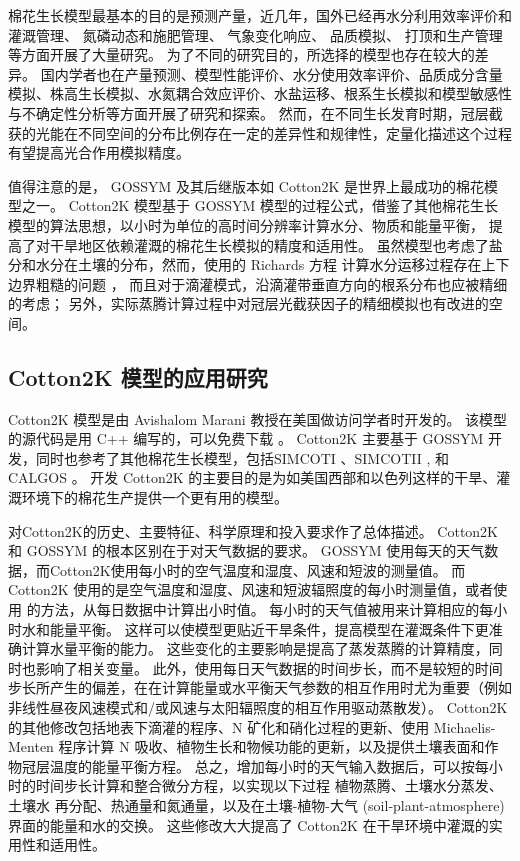 棉花生长模型最基本的目的是预测产量，近几年，国外已经再水分利用效率评价和灌溉管理\cite{baumhardt2014,booker2014,booker2015,modala2015,thorp2015,anapalli2016,attia2016,linker2016,tsakmakis2018,thorp2019,thorp2020,thorp2020a}、
氮磷动态和施肥管理\cite{shumway2012,amin2017,arshad2017,zurweller2019}、%
气象变化响应\cite{abbas2020}、%
品质模拟\cite{ma2005}、%
打顶和生产管理\cite{yang2008}等方面开展了大量研究。
为了不同的研究目的，所选择的模型也存在较大的差异。
国内学者也在产量预测、模型性能评价、水分使用效率评价、品质成分含量模拟、株高生长模拟、水氮耦合效应评价、水盐运移、根系生长模拟和模型敏感性与不确定性分析等方面开展了研究和探索。
然而，在不同生长发育时期，冠层截获的光能在不同空间的分布比例存在一定的差异性和规律性，定量化描述这个过程有望提高光合作用模拟精度。

值得注意的是， GOSSYM 及其后继版本如 Cotton2K 是世界上最成功的棉花模型之一。
Cotton2K 模型基于 GOSSYM 模型的过程公式，借鉴了其他棉花生长模型的算法思想，以小时为单位的高时间分辨率计算水分、物质和能量平衡，%
提高了对干旱地区依赖灌溉的棉花生长模拟的精度和适用性。
虽然模型也考虑了盐分和水分在土壤的分布，然而，使用的 Richards 方程 \cite{richards1931} 计算水分运移过程存在上下边界粗糙的问题 \cite{thorp2014}，
而且对于滴灌模式，沿滴灌带垂直方向的根系分布也应被精细的考虑；
另外，实际蒸腾计算过程中对冠层光截获因子的精细模拟也有改进的空间。

\subsection{Cotton2K 模型的应用研究}
Cotton2K 模型是由 Avishalom Marani 教授在美国做访问学者时开发的。
该模型的源代码是用 C++ 编写的，可以免费下载 \cite{cotton2kv4}。
Cotton2K 主要基于 GOSSYM \cite{baker1976,baker1983} 开发，同时也参考了其他棉花生长模型，包括SIMCOTI \cite{baker1972}、SIMCOTII \cite{jones1974}, 和 CALGOS \cite{marani1992a,marani1992b,marani1992c}。
开发 Cotton2K 的主要目的是为如美国西部和以色列这样的干旱、灌溉环境下的棉花生产提供一个更有用的模型。

 对Cotton2K的历史、主要特征、科学原理和投入要求作了总体描述。
Cotton2K 和 GOSSYM 的根本区别在于对天气数据的要求。
GOSSYM 使用每天的天气数据，而Cotton2K使用每小时的空气温度和湿度、风速和短波的测量值。
而 Cotton2K 使用的是空气温度和湿度、风速和短波辐照度的每小时测量值，或者使用  的方法，从每日数据中计算出小时值。
每小时的天气值被用来计算相应的每小时水和能量平衡。
这样可以使模型更贴近干旱条件，提高模型在灌溉条件下更准确计算水量平衡的能力\cite{cotton2kv4}。
这些变化的主要影响是提高了蒸发蒸腾的计算精度，同时也影响了相关变量。
此外，使用每日天气数据的时间步长，而不是较短的时间步长所产生的偏差，在在计算能量或水平衡天气参数的相互作用时尤为重要（例如非线性昼夜风速模式和/或风速与太阳辐照度的相互作用驱动蒸散发）\cite{ephrath1996}。
Cotton2K 的其他修改包括地表下滴灌的程序、N 矿化和硝化过程的更新、使用 Michaelis-Menten 程序计算 N 吸收、植物生长和物候功能的更新，以及提供土壤表面和作物冠层温度的能量平衡方程\cite{cotton2kv4}。
总之，增加每小时的天气输入数据后，可以按每小时的时间步长计算和整合微分方程，以实现以下过程 植物蒸腾、土壤水分蒸发、土壤水 再分配、热通量和氮通量，以及在土壤-植物-大气 (soil-plant-atmosphere) 界面的能量和水的交换。
这些修改大大提高了 Cotton2K 在干旱环境中灌溉的实用性和适用性。

